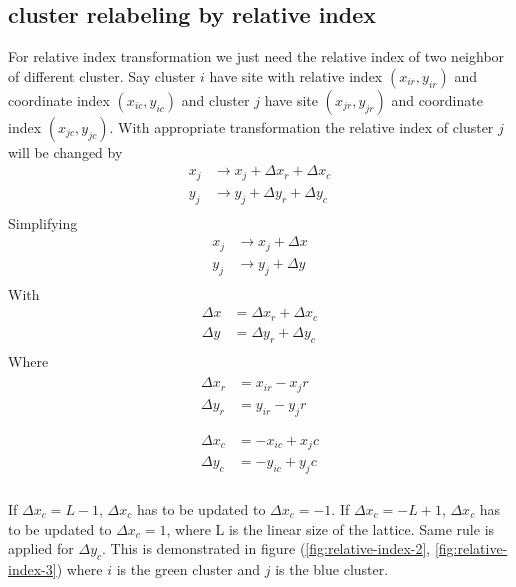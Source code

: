 \subsection{cluster relabeling by relative index}
For relative index transformation we just need the relative index of two neighbor of different cluster. Say cluster $i$ have site with relative index $(x_{ir},y_{ir})$  and coordinate index $(x_{ic},y_{ic})$ and cluster $j$ have site $(x_{jr},y_{jr})$ and coordinate index $(x_{jc},y_{jc})$.
With appropriate transformation the relative index of cluster $j$ will be changed by
\begin{equation}
\begin{split}
	x_j &\rightarrow x_j + \Delta x_r + \Delta x_c \\
	y_j &\rightarrow y_j + \Delta y_r + \Delta y_c \\
\end{split}
\end{equation}
Simplifying
\begin{equation}
\begin{split}
	x_j &\rightarrow x_j + \Delta x \\
	y_j &\rightarrow y_j + \Delta y \\
\end{split}
\end{equation}
With
\begin{equation}
\begin{split}
\Delta x &= \Delta x_r + \Delta x_c  \\
\Delta y &= \Delta y_r + \Delta y_c  \\
\end{split}
\end{equation}
Where
\begin{align}
\begin{split}
\Delta x_r &= x_{ir}-{x_jr}  \\
\Delta y_r &= y_{ir}-{y_jr}  \\
\end{split}
\\
\begin{split}
\Delta x_c &= -x_{ic}+{x_jc} \\
\Delta y_c &= -y_{ic}+{y_jc}  \\
\end{split}
\end{align}

If $\Delta x_c=L-1$, $\Delta x_c$ has to be updated to $\Delta x_c=-1$. If $\Delta x_c=-L+1$, $\Delta x_c$ has to be updated to $\Delta x_c=1$, where L is the linear size of the lattice. Same rule is applied for $\Delta y_c$.  This is demonstrated in figure (\ref{fig:relative-index-2}, \ref{fig:relative-index-3}) where $i$ is the green cluster and $j$ is the blue cluster. 


